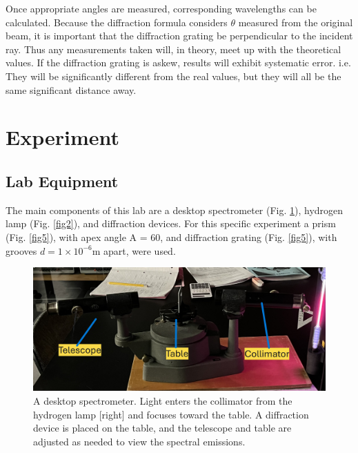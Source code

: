 \documentclass[letterpaper,11pt] {article}
\begin{document}
Once appropriate angles are measured, corresponding wavelengths can be calculated. Because the diffraction formula considers $\theta$ measured from the original beam, it is important that the diffraction grating be perpendicular to the incident ray. Thus any measurements taken will, in theory, meet up with the theoretical values. If the diffraction grating is askew, results will exhibit systematic error. i.e. They will be significantly different from the real values, but they will all be the same significant distance away. 


\section{Experiment}

\subsection{Lab Equipment}

The main components of this lab are a desktop spectrometer (Fig. \ref{fig1}), hydrogen lamp (Fig. \ref{fig2}), and diffraction devices. For this specific experiment a prism (Fig. \ref{fig5}), with apex angle A = 60\textdegree\text{}, and diffraction grating (Fig. \ref{fig5}), with grooves $d = 1\times 10^{-6}$m apart, were used. 

\begin{figure}[H] 
        \centering \includegraphics[width=0.8\columnwidth]{H-Spectrum Lab photos/Spectrometer_Markup.JPG}
        \caption{\label{fig1}A desktop spectrometer. Light enters the collimator from the hydrogen lamp [right] and focuses toward the table. A diffraction device is placed on the table, and the telescope and table are adjusted as needed to view the spectral emissions. 
        }
\end{figure}
\end{document}
